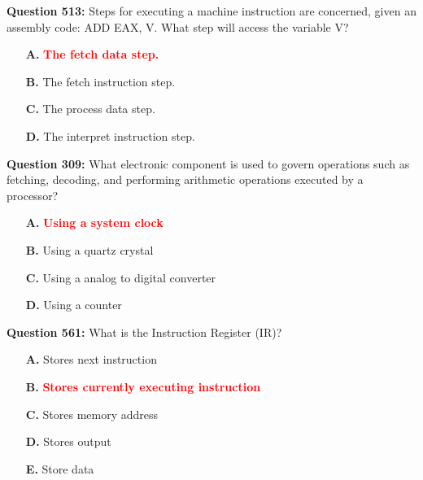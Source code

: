 \documentclass[12pt,a4paper]{article}
\begin{document}
\vspace{0.5cm}

\textbf{Question 513:} Steps for executing a machine instruction are concerned, given an assembly code: ADD EAX, V. What step will access the variable V?

\begin{itemize}
    \item[\textbf{A.}] \textcolor{red}{\textbf{The fetch data step.}}
    \item[\textbf{B.}] The fetch instruction step.
    \item[\textbf{C.}] The process data step.
    \item[\textbf{D.}] The interpret instruction step.
\end{itemize}

\vspace{0.5cm}

\vspace{0.5cm}

\textbf{Question 309:} What electronic component is used to govern operations such as fetching, decoding, and performing arithmetic operations executed by a processor?

\begin{itemize}
    \item[\textbf{A.}] \textcolor{red}{\textbf{Using a system clock}}
    \item[\textbf{B.}] Using a quartz crystal
    \item[\textbf{C.}] Using a analog to digital converter
    \item[\textbf{D.}] Using a counter
\end{itemize}

\vspace{0.5cm}

\vspace{0.5cm}



\textbf{Question 561:} What is the Instruction Register (IR)?

\begin{itemize}
    \item[\textbf{A.}] Stores next instruction
    \item[\textbf{B.}] \textcolor{red}{\textbf{Stores currently executing instruction}}
    \item[\textbf{C.}] Stores memory address
    \item[\textbf{D.}] Stores output
    \item[\textbf{E.}] Store data
\end{itemize}
\end{document}
